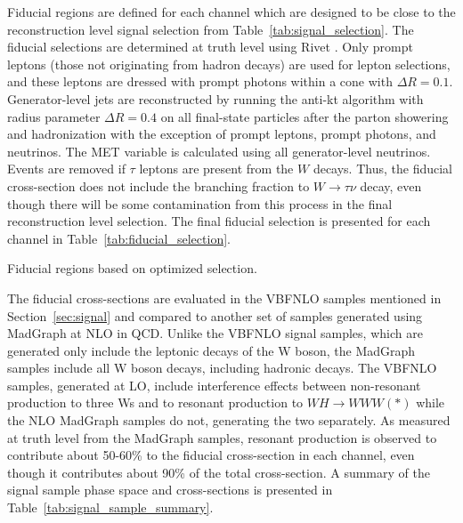 Fiducial regions are defined for each channel which are designed to be close to the reconstruction
level signal selection from Table~\ref{tab:signal_selection}.  
The fiducial selections are determined at truth level using Rivet \cite{Buckley:2010ar}.
Only prompt leptons (those not originating from hadron decays) are used for lepton selections, and these leptons are dressed with prompt photons within a cone with $\Delta R = 0.1$. Generator-level jets are reconstructed by running the anti-kt algorithm with radius parameter $\Delta R = 0.4$ on all final-state particles after the parton showering and hadronization with the exception of prompt leptons, prompt photons, and neutrinos. The MET variable is calculated using all generator-level neutrinos. 
Events are removed if $\tau$ leptons are present from the $W$ decays.  Thus, the fiducial cross-section
does not include the branching fraction to $W\rightarrow\tau\nu$ decay, even though there will be some contamination from this process in the final reconstruction level selection. The final fiducial selection is presented
for each channel in Table~\ref{tab:fiducial_selection}.


\begin{table}[ht!]
\centering
\begin{footnotesize}

\end{footnotesize}
\caption{Fiducial regions based on optimized selection.}
\label{tab:fiducial_selection}
\end{table}

The fiducial cross-sections are evaluated in the VBFNLO samples mentioned in Section~\ref{sec:signal} and compared
to another set of samples generated using MadGraph at NLO in QCD. Unlike the VBFNLO signal samples, which are 
generated only include the leptonic decays of the W boson, the MadGraph samples include all W boson decays, including hadronic decays. The VBFNLO samples, generated at LO, include interference effects between non-resonant production to three Ws and to resonant production to $WH\rightarrow WWW(*)$ while the NLO MadGraph samples do not, generating the two separately. As measured at truth level from the MadGraph samples, resonant production is observed to contribute about 50-60\% to
the fiducial cross-section in each channel, even though it contributes about 90\% of the total cross-section.  A summary of the signal sample phase space and cross-sections is
presented in Table~\ref{tab:signal_sample_summary}.

